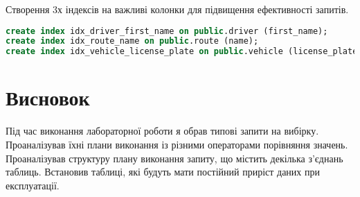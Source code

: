 \documentclass[14pt]{extreport}
\begin{document}
\begin{normalsize}
	Створення 3х індексів на важливі колонки для підвищення ефективності запитів.
	\begin{small}
		\begin{lstlisting}[language=sql]
create index idx_driver_first_name on public.driver (first_name);
create index idx_route_name on public.route (name);
create index idx_vehicle_license_plate on public.vehicle (license_plate);
		\end{lstlisting}
	\end{small}
	
	\section*{Висновок}
	Під час виконання лабораторної роботи я обрав типові запити на вибірку. Проаналізував їхні плани виконання із різними операторами порівняння значень. Проаналізував структуру плану виконання запиту, що містить декілька з’єднань таблиць. Встановив таблиці, які будуть мати постійний приріст даних при експлуатації.
	 
\end{normalsize}
\end{document}
